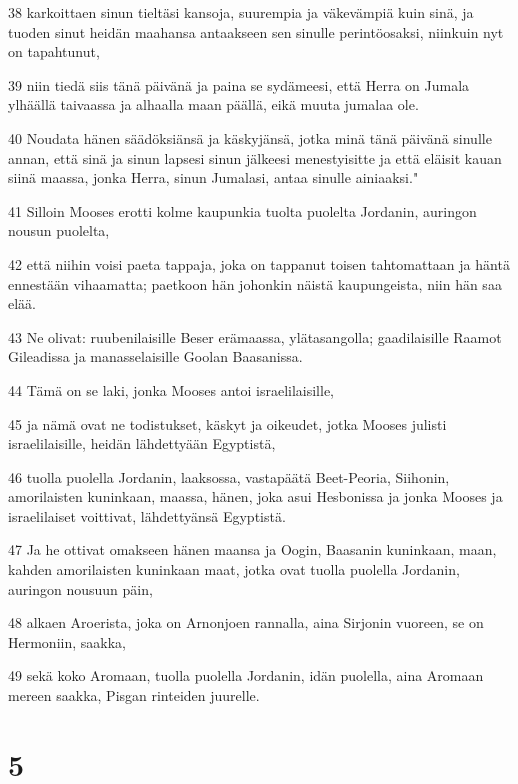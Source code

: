 \par 38 karkoittaen sinun tieltäsi kansoja, suurempia ja väkevämpiä kuin sinä, ja tuoden sinut heidän maahansa antaakseen sen sinulle perintöosaksi, niinkuin nyt on tapahtunut,
\par 39 niin tiedä siis tänä päivänä ja paina se sydämeesi, että Herra on Jumala ylhäällä taivaassa ja alhaalla maan päällä, eikä muuta jumalaa ole.
\par 40 Noudata hänen säädöksiänsä ja käskyjänsä, jotka minä tänä päivänä sinulle annan, että sinä ja sinun lapsesi sinun jälkeesi menestyisitte ja että eläisit kauan siinä maassa, jonka Herra, sinun Jumalasi, antaa sinulle ainiaaksi."
\par 41 Silloin Mooses erotti kolme kaupunkia tuolta puolelta Jordanin, auringon nousun puolelta,
\par 42 että niihin voisi paeta tappaja, joka on tappanut toisen tahtomattaan ja häntä ennestään vihaamatta; paetkoon hän johonkin näistä kaupungeista, niin hän saa elää.
\par 43 Ne olivat: ruubenilaisille Beser erämaassa, ylätasangolla; gaadilaisille Raamot Gileadissa ja manasselaisille Goolan Baasanissa.
\par 44 Tämä on se laki, jonka Mooses antoi israelilaisille,
\par 45 ja nämä ovat ne todistukset, käskyt ja oikeudet, jotka Mooses julisti israelilaisille, heidän lähdettyään Egyptistä,
\par 46 tuolla puolella Jordanin, laaksossa, vastapäätä Beet-Peoria, Siihonin, amorilaisten kuninkaan, maassa, hänen, joka asui Hesbonissa ja jonka Mooses ja israelilaiset voittivat, lähdettyänsä Egyptistä.
\par 47 Ja he ottivat omakseen hänen maansa ja Oogin, Baasanin kuninkaan, maan, kahden amorilaisten kuninkaan maat, jotka ovat tuolla puolella Jordanin, auringon nousuun päin,
\par 48 alkaen Aroerista, joka on Arnonjoen rannalla, aina Sirjonin vuoreen, se on Hermoniin, saakka,
\par 49 sekä koko Aromaan, tuolla puolella Jordanin, idän puolella, aina Aromaan mereen saakka, Pisgan rinteiden juurelle.

\chapter{5}

